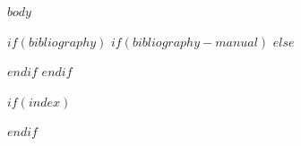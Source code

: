 \documentclass[a4paper,11pt,twoside,openright,notitlepage]{book}
\makeatletter
\def\cleardoublepage{%
  \clearpage
  \if@twoside
    \ifodd\c@page\else
      \thispagestyle{empty}%
      \hbox{}\newpage
      \if@twocolumn\hbox{}\newpage\fi
    \fi
  \fi
}
\makeatother
\begin{document}
\pagestyle{fancy}
\setlength{\headwidth}{\textwidth}
\makeatletter
\renewcommand{\@mkboth}[2]{\markboth{#1}{}}
\makeatother

$body$

$if(bibliography)$
$if(bibliography-manual)$
$else$
\cleardoublepage{}
{}


$endif$
$endif$

$if(index)$
\cleardoublepage{}
{}
\printindex
$endif$
\end{document}
